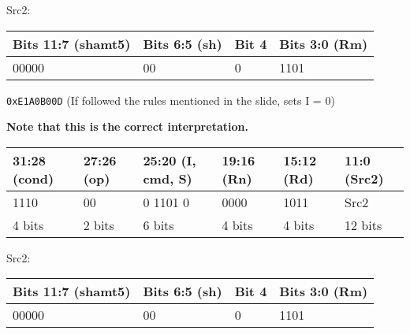 \documentclass[12pt, xcolor=dvipsnames,svgnames,x11names]{article}
\begin{document}
{\begin{tcolorbox}
                \vspace{0.5cm}

                Src2:

                \vspace{0.5cm}

                \begin{tabular}{|p{8em}|p{5em}|p{4em}|p{6em}|}
                    \hline
                    Bits 11:7 (shamt5) & Bits 6:5 (sh) & Bit 4 &  Bits 3:0 (Rm)\\
                    \hline
                    00000 & 00 & 0 &  1101  \\
                    \hline
                \end{tabular} 

                \vspace{0.5cm}

            \texttt{0xE1A0B00D} (If followed the rules mentioned in the slide, sets I = 0)

            \textbf{Note that this is the correct interpretation.}

            \vspace{0.5cm}

            \begin{tabular}{|p{5em}|p{5em}|p{6em}|p{5em}|p{5em}|p{5.5em}|}
                \hline
                31:28 (cond) & 27:26 (op) & 25:20 (I, cmd, S) & 19:16 (Rn) & 15:12 (Rd) & 11:0 (Src2) \\
                \hline
                1110 & 00 & 0 1101 0 & 0000 & 1011 & Src2 \\
                \hline
                4 bits & 2 bits & 6 bits & 4 bits & 4 bits & 12 bits \\
                \hline
                \end{tabular}

                \vspace{0.5cm}

                Src2:

                \vspace{0.5cm}

                \begin{tabular}{|p{8em}|p{5em}|p{4em}|p{6em}|}
                    \hline
                    Bits 11:7 (shamt5) & Bits 6:5 (sh) & Bit 4 &  Bits 3:0 (Rm)\\
                    \hline
                    00000 & 00 & 0 &  1101  \\
                    \hline
                \end{tabular} 


\end{tcolorbox}}
\end{document}
